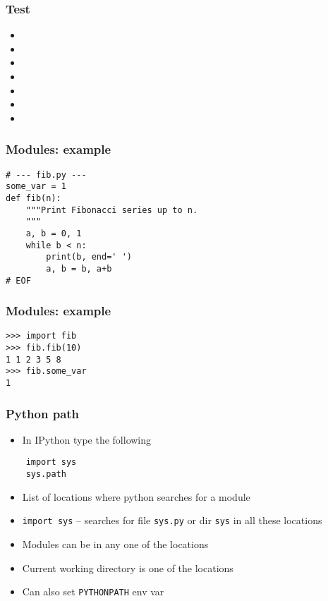 \documentclass[14pt,compress]{beamer}
\begin{document}
\begin{frame}[fragile]
  \frametitle{Test}
  \begin{itemize}
  \item {}
  \item {}
  \item {}
  \item {}
  \item {}
  \item {}
  \item {}
  \end{itemize}
\end{frame}

\begin{frame}[fragile]
  \frametitle{Modules: example}
  \begin{lstlisting}
# --- fib.py ---
some_var = 1
def fib(n):
    """Print Fibonacci series up to n.
    """
    a, b = 0, 1
    while b < n:
        print(b, end=' ')
        a, b = b, a+b
# EOF
  \end{lstlisting}
\end{frame}

\begin{frame}[fragile]
  \frametitle{Modules: example}
  \begin{lstlisting}
>>> import fib
>>> fib.fib(10)
1 1 2 3 5 8
>>> fib.some_var
1
  \end{lstlisting}
\end{frame}


\begin{frame}[fragile]
  \frametitle{Python path}
  \begin{itemize}
  \item In IPython type the following
  \end{itemize}
  \begin{lstlisting}
    import sys
    sys.path
  \end{lstlisting}
  \begin{itemize}
  \item List of locations where python searches for a module
  \item \texttt{import sys} -- searches for file \texttt{sys.py} or
    dir \texttt{sys} in all these locations
  \item Modules can be in any one of the locations
  \item Current working directory is one of the locations
  \item Can also set \texttt{PYTHONPATH} env var
  \end{itemize}
\end{frame}
\end{document}
